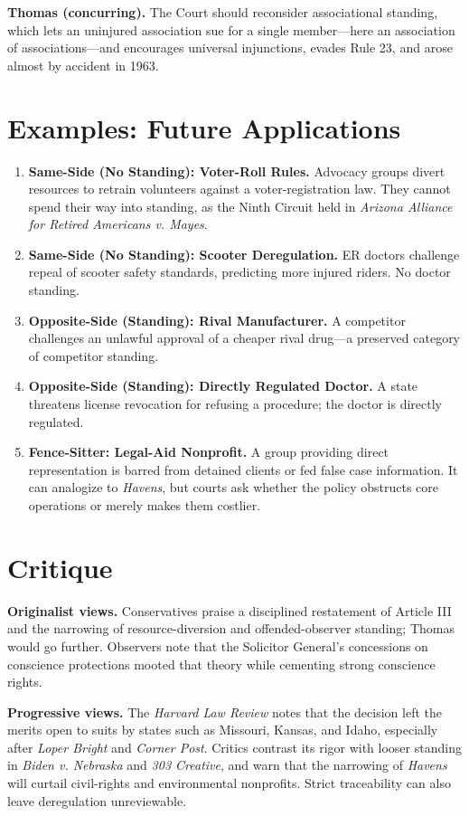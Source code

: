 \documentclass[12pt]{article}
\begin{document}
\textbf{Thomas (concurring).} The Court should reconsider associational standing, which lets an uninjured association sue for a single member---here an association of associations---and encourages universal injunctions, evades Rule 23, and arose almost by accident in 1963.

\section{Examples: Future Applications}

\begin{enumerate}
\item \textbf{Same-Side (No Standing): Voter-Roll Rules.} Advocacy groups divert resources to retrain volunteers against a voter-registration law. They cannot spend their way into standing, as the Ninth Circuit held in \textit{Arizona Alliance for Retired Americans v. Mayes}.
\item \textbf{Same-Side (No Standing): Scooter Deregulation.} ER doctors challenge repeal of scooter safety standards, predicting more injured riders. No doctor standing.
\item \textbf{Opposite-Side (Standing): Rival Manufacturer.} A competitor challenges an unlawful approval of a cheaper rival drug---a preserved category of competitor standing.
\item \textbf{Opposite-Side (Standing): Directly Regulated Doctor.} A state threatens license revocation for refusing a procedure; the doctor is directly regulated.
\item \textbf{Fence-Sitter: Legal-Aid Nonprofit.} A group providing direct representation is barred from detained clients or fed false case information. It can analogize to \textit{Havens}, but courts ask whether the policy obstructs core operations or merely makes them costlier.
\end{enumerate}

\section{Critique}

\textbf{Originalist views.} Conservatives praise a disciplined restatement of Article III and the narrowing of resource-diversion and offended-observer standing; Thomas would go further. Observers note that the Solicitor General's concessions on conscience protections mooted that theory while cementing strong conscience rights.

\textbf{Progressive views.} The \textit{Harvard Law Review} notes that the decision left the merits open to suits by states such as Missouri, Kansas, and Idaho, especially after \textit{Loper Bright} and \textit{Corner Post}. Critics contrast its rigor with looser standing in \textit{Biden v. Nebraska} and \textit{303 Creative}, and warn that the narrowing of \textit{Havens} will curtail civil-rights and environmental nonprofits. Strict traceability can also leave deregulation unreviewable.
\end{document}
